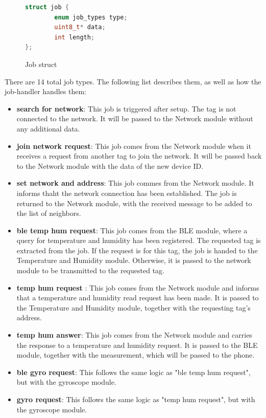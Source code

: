 \begin{figure}[h]
    \centering
    \begin{lstlisting}[language=c]
    struct job {
  		enum job_types type;
  		uint8_t* data;
  		int length;
};
    \end{lstlisting}
    \caption{Job struct}
	\label{code:job_struct}
\end{figure}

There are 14 total job types.
The following list describes them, as well as how the job-handler handles them:
\begin{itemize}
  \item \textbf{search for network}: This job is triggered after setup. The tag is not connected to the network. It will be passed to the Network module without any additional data.
  \item \textbf{join network request}: This job comes from the Network module when it receives a request from another tag to join the network. It will be passed back to the Network module with the data of the new device ID.
  \item \textbf{set network and address}: This job commes from the Network module. It informs thaht the network connection has been established. The job is returned to the Network module, with the received message to be added to the list of neighbors.
  \item \textbf{ble temp hum request}: This job comes from the BLE module, where a query for temperature and humidity has been registered. The requested tag is extracted from the job. If the request is for this tag, the job is handed to the Temperature and Humidity module. Otherwise, it is passed to the network module to be transmitted to the requested tag.
  \item \textbf{temp hum request }: This job comes from the Network module and informs that a temperature and humidity read request has been made. It is passed to the Temperature and Humidity module, together with the requesting tag's address.
  \item \textbf{temp hum answer}: This job comes from the Network module and carries the response to a temperature and humidity request. It is passed to the BLE module, together with the measurement, which will be passed to the phone.
  \item \textbf{ble gyro request}: This follows the same logic as "ble temp hum request", but with the gyroscope module.
  \item \textbf{gyro request}: This follows the same logic as "temp hum request", but with the gyroscope module.

\end{itemize}
